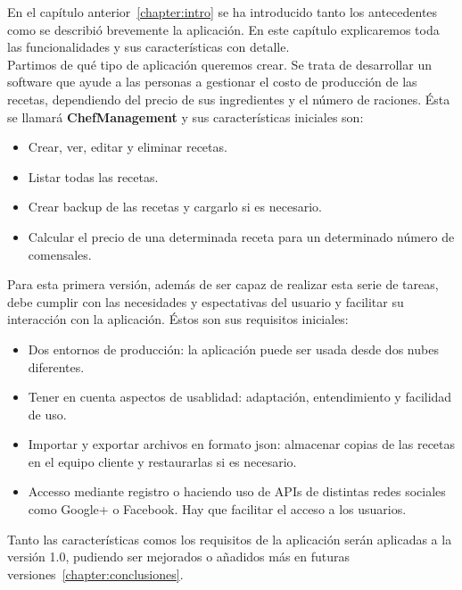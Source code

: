 
En el capítulo anterior~\ref{chapter:intro} se ha introducido tanto los antecedentes como se describió brevemente la aplicación. En este capítulo explicaremos toda las funcionalidades y sus características con detalle. \\

Partimos de qué tipo de aplicación queremos crear. Se trata de desarrollar un software que ayude a las personas a gestionar el costo de producción de las recetas, dependiendo del precio de sus ingredientes y el número de raciones. Ésta se llamará \textbf{ChefManagement} y sus características iniciales son:
\begin{itemize}
	\item Crear, ver, editar y eliminar recetas.
	\item Listar todas las recetas.
	\item Crear backup de las recetas y cargarlo si es necesario.
	\item Calcular el precio de una determinada receta para un determinado número de comensales.
\end{itemize}

Para esta primera versión, además de ser capaz de realizar esta serie de tareas, debe  cumplir con las necesidades y espectativas del usuario y facilitar su interacción con la aplicación. Éstos son sus requisitos iniciales:
\begin{itemize}
	\item Dos entornos de producción: la aplicación puede ser usada desde dos nubes diferentes.
	\item Tener en cuenta aspectos de usablidad: adaptación, entendimiento y facilidad de uso.
	\item Importar y exportar archivos en formato json: almacenar copias de las recetas en el equipo cliente y restaurarlas si es necesario.
	\item Accesso mediante registro o haciendo uso de APIs de distintas redes sociales como Google+ o Facebook. Hay que facilitar el acceso a los usuarios.
\end{itemize}

Tanto las características comos los requisitos de la aplicación serán aplicadas a la versión 1.0, pudiendo ser mejorados o añadidos más en futuras versiones~\ref{chapter:conclusiones}.

